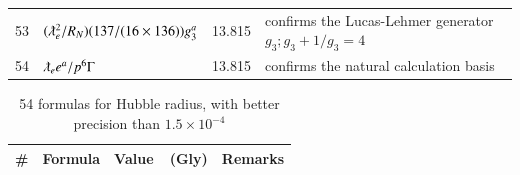 \documentclass[a4paper,9pt]{article}
\begin{document}
\begin{appendix}
\begin{table}
\begin{tabular}{llll}
    53 & $(\lambdabar_{e}^2/R_N) (137/(16 \times 136)) g_3^a$ & 13.815 & confirms the Lucas-Lehmer generator $g_3 ; g_3 +1/g_3 = 4$ \\
    54 & $\lambdabar_{e} e^a/p^6\Gamma $ & 13.815 & confirms the natural calculation basis \\
    
    
    
   

    \bottomrule
  \end{tabular}
\end{table}


\begin{table}
\caption{54 formulas for Hubble radius, with better precision than $1.5 \times 10^{-4}$}
\label{tab:5:table5}
  \hskip-2.0cm\begin{tabular}{llll}
    \toprule
    \cmidrule(r){1-4}
   \#     & Formula     & Value~~(Gly) & Remarks \\
    \midrule    
    

\end{tabular}
\end{table}
\end{appendix}
\end{document}
